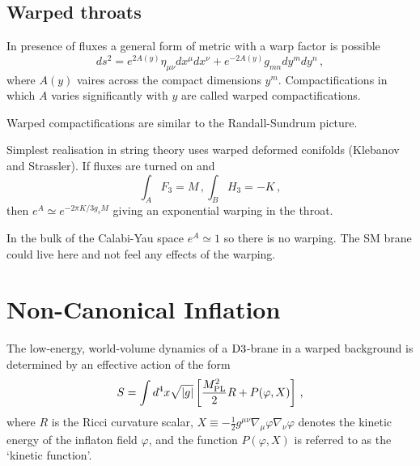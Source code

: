 \subsection{Warped throats}
In presence of fluxes a general form of metric with a warp factor is possible
\begin{equation}
 ds^2 = e^{2A(y)}\eta_{\mu\nu} dx^\mu dx^\nu + e^{-2A(y)} g_{mn}dy^m dy^n\,,
\end{equation}
where $A(y)$ vaires across the compact dimensions $y^m$.
Compactifications in which $A$ varies significantly with $y$ are called warped
compactifications.

Warped compactifications are similar to the Randall-Sundrum picture.

Simplest realisation in string theory uses warped deformed conifolds (Klebanov
and Strassler). 
If fluxes are turned on and
\begin{equation}
 \int_A F_3 = M \,, \int_B H_3 = -K\,,
\end{equation}
then $e^A \simeq e^{-2\pi K/3g_s M}$ giving an exponential warping in the
throat.

In the bulk of the Calabi-Yau space $e^A \simeq 1$ so there is no warping. The
SM brane could live here and not feel any effects of the warping.



% 
% 
\section{Non-Canonical Inflation} 
\label{sec:noncanoninfl}


The low-energy, world-volume dynamics of a 
${\rm D3}$-brane in a warped background is determined 
by an effective action of the form 
% 
\begin{equation}
\label{eq:DBIaction-dbiintro2}
S=\int  d^4x \sqrt{|g|} \left[ \frac{M_{\mathrm{PL}}^2}{2} R 
+ P (\varphi , X) \right] \,,
\end{equation}
% 
where $R$ is the Ricci curvature scalar, 
$X \equiv -\frac{1}{2}g^{\mu \nu}\nabla_\mu \varphi \nabla_\nu \varphi$
denotes the kinetic energy of the inflaton field $\varphi$, and the function  
$P (\varphi , X)$ is referred to as the `kinetic function'.  


